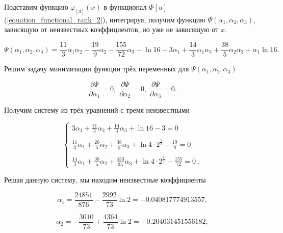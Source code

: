 \documentclass{article}
\begin{document}
\noindent Подставим функцию $\varphi_{[3]}(x)$ в функционал $\Phi[u]$ (\ref{equation_functional_rank_2}), интегрируя, получим функцию $\Psi(\alpha_{1}, \alpha_{2}, \alpha_{3})$, зависящую от неизвестных коэффициентов, но уже не зависящую от $x$.

\begin{displaymath}
	\Psi(\alpha_{1}, \alpha_{2}, \alpha_{3}) = \frac{11}{3}\alpha_{1}\alpha_{2} - \frac{19}{9}\alpha_{2} - \frac{155}{72}\alpha_{3} - \ln{16} - 3\alpha_{1} + \frac{14}{3}\alpha_{1}\alpha_{3} + \frac{38}{5}\alpha_{2}\alpha_{3} + \alpha_{1}\ln{16}.
\end{displaymath}

Решим задачу минимизации функции трёх переменных для $\Psi(\alpha_{1}, \alpha_{2}, \alpha_{3})$

\begin{displaymath}
	\frac{\partial \Psi}{\partial \alpha_{1}} = 0, \;
	\frac{\partial \Psi}{\partial \alpha_{2}} = 0, \;
	\frac{\partial \Psi}{\partial \alpha_{3}} = 0.
\end{displaymath}

\noindent Получим систему из трёх уравнений с тремя неизвестными

\begin{displaymath}
	\begin{cases}
		3\alpha_{1} + \frac{11}{3}\alpha_{2} + \frac{14}{3}\alpha_{3} + \ln{16} - 3 = 0 \\
		\\
		\frac{11}{3}\alpha_{1} + \frac{26}{5}\alpha_{2} + \frac{38}{5}\alpha_{3} + \ln{4 \cdot 2^{\frac{2}{3}}} - \frac{19}{9} = 0 \\
		\\
		\frac{14}{3}\alpha_{1} + \frac{38}{5}\alpha_{2} + \frac{433}{35}\alpha_{3} + \ln{4 \cdot 2^{\frac{2}{3}}} - \frac{155}{72} = 0 \; .
	\end{cases}
\end{displaymath}

\noindent Решая данную систему, мы находим неизвестные коэффициенты

\begin{displaymath}
	\alpha_{1} = \frac{24851}{876} - \frac{2992}{73} \ln{2} = -0.040817774913557,
\end{displaymath}

\begin{displaymath}	
	\alpha_{2} = -\frac{3010}{73} + \frac{4364}{73} \ln{2} = -0.204031451556182, 
\end{displaymath}
\end{document}
